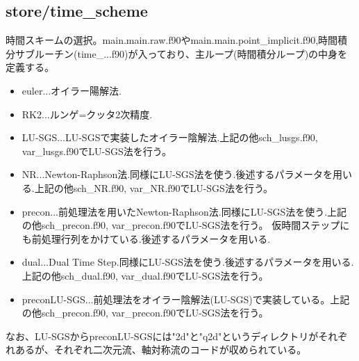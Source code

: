 \documentclass{jsarticle}
\begin{document}
\subsection{store/time\_scheme}%
時間スキームの選択。main.main.raw.f90やmain.main.point\_implicit.f90,時間積分サブルーチン(time\_...f90)が入っており、主ループ(時間積分ループ)の中身を定義する。
\begin{itemize}
\item euler...オイラー陽解法.
\item RK2...ルンゲ=クッタ2次精度.
\item LU-SGS...LU-SGSで実装したオイラー陰解法.上記の他sch\_lusgs.f90, var\_lusgs.f90でLU-SGS法を行う。
\item NR...Newton-Raphson法.同様にLU-SGS法を使う.後述するパラメータを用いる.上記の他sch\_NR.f90, var\_NR.f90でLU-SGS法を行う。
\item precon...前処理法を用いたNewton-Raphson法.同様にLU-SGS法を使う.上記の他sch\_precon.f90, var\_precon.f90でLU-SGS法を行う。
仮時間ステップにも前処理行列をかけている.後述するパラメータを用いる.
\item dual...Dual Time Step.同様にLU-SGS法を使う.後述するパラメータを用いる.上記の他sch\_dual.f90, var\_dual.f90でLU-SGS法を行う。
\item preconLU-SGS...前処理法をオイラー陰解法(LU-SGS)で実装している。上記の他sch\_precon.f90, var\_precon.f90でLU-SGS法を行う。
\end{itemize}
なお、LU-SGSからpreconLU-SGSには"2d"と"q2d"というディレクトリがそれぞれあるが、それぞれ二次元流、軸対称流のコードが収められている。
\end{document}
